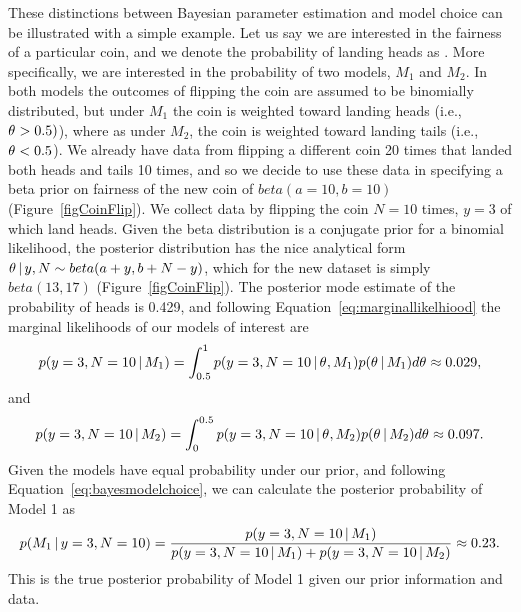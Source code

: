 These distinctions between Bayesian parameter estimation and model choice can
be illustrated with a simple example.
Let us say we are interested in the fairness of a particular coin, and we
denote the probability of landing heads as \myTheta{}.
More specifically, we are interested in the probability of two models, $M_1$
and $M_2$.
In both models the outcomes of flipping the coin are assumed to be binomially
distributed, but under $M_1$ the coin is weighted toward landing heads (i.e.,
$\theta_{} > 0.5)$), where as under $M_2$, the coin is weighted toward landing
tails (i.e., $\theta_{} < 0.5$).
We already have data from flipping a different coin 20 times that landed both
heads and tails 10 times, and so we decide to use these data in specifying a
beta prior on fairness of the new coin of $beta(a=10, b=10)$
(Figure~\ref{figCoinFlip}).
We collect data by flipping the coin $N=10$ times, $y=3$ of which land heads.
Given the beta distribution is a conjugate prior for a binomial likelihood, the
posterior distribution has the nice analytical form $\theta \,|\, y,N \sim
beta(a + y, b + N - y)$, which for the new dataset is simply $beta(13, 17)$
(Figure~\ref{figCoinFlip}).
The posterior mode estimate of the probability of heads is 0.429, and following
Equation~\ref{eq:marginallikelhiood} the marginal likelihoods of our models of
interest are
\begin{equation}
    p(y=3, N=10 \,|\, M_1) = \int_{0.5}^{1} p(y=3, N=10 \,|\,
    \theta_{}, M_1)p(\theta_{} \,|\, M_1) d\theta_{} \approx 0.029,
\end{equation}
and
\begin{equation}
    p(y=3, N=10 \,|\, M_2) = \int_{0}^{0.5} p(y=3, N=10 \,|\,
    \theta_{}, M_2)p(\theta_{} \,|\, M_2) d\theta_{} \approx 0.097.
\end{equation}
Given the models have equal probability under our prior, and following
Equation~\ref{eq:bayesmodelchoice}, we can calculate the posterior
probability of Model 1 as
\begin{equation}
    p(M_1 \,|\, y=3, N=10) = \frac{p(y=3, N=10 \,|\, M_1)}{p(y=3, N=10 \,|\,
    M_1) + p(y=3, N=10 \,|\, M_2)} \approx 0.23.
\end{equation}
This is the true posterior probability of Model 1 given our prior information
and data.

